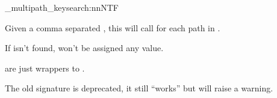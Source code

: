\documentclass[10pt]{article}
\begin{document}
\begin{codedescribe}[code,update=2025/05/26]{\pgfkeysearch_multipath_keysearch:nnNTF}
\begin{codesyntax}%
\end{codesyntax}
Given a comma separated , this will call   for each path in .
\end{codedescribe}
\begin{tsremark}
  If  isn't found,  won't be assigned any value.
\end{tsremark}
\begin{tsremark}
  \tsobj{\pgfkeysearchvalueof,\pgfkeysearch,\pgfkeysearchvalueofTF,\pgfkeysearchTF} are just wrappers to .
\end{tsremark}
\begin{tsremark}
  The old signature  is deprecated, it still ``works'' but will raise a warning.
\end{tsremark}
\end{document}
